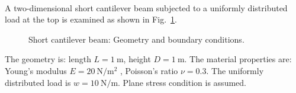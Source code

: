 \paragraph{}
A two-dimensional short cantilever beam subjected to a uniformly distributed load at the top is examined as shown in Fig.~\ref{adp_fig:ex_cantilever_beam_geo_bc}.
    \begin{figure}[h!]
    \centering
        \caption{ Short cantilever beam: Geometry and boundary conditions.}
        \label{adp_fig:ex_cantilever_beam_geo_bc}
    \end{figure}

The geometry is: length $L = \SI{1}{\meter} $, height $ D = \SI{1}{\meter} $.
The material properties are: Young’s modulus $ E = \SI{20}{\newton \per \meter^2} $ , Poisson’s ratio $ \nu =0.3 $.
The uniformly distributed load is $w = \SI{10}{\newton \per \meter} $.
Plane stress condition is assumed.

